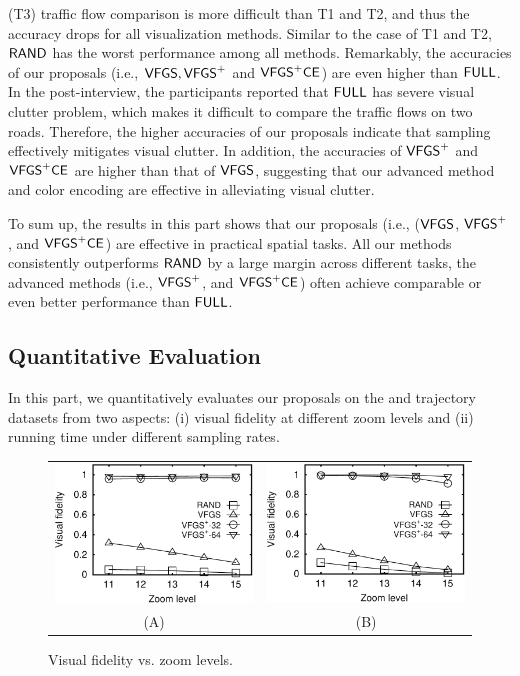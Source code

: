 (T3) traffic flow comparison is more difficult than T1 and T2, and thus the accuracy drops for all visualization methods. Similar to the case of T1 and T2, $\mathsf{RAND}$ has the worst performance among all methods. Remarkably, the accuracies of our proposals (i.e.,  $\mathsf{VFGS},\mathsf{VFGS}^{+}$ and $\mathsf{VFGS}^{+}\mathsf{CE}$) are even higher than $\mathsf{FULL}$. In the post-interview, the participants reported that $\mathsf{FULL}$ has severe visual clutter problem, which makes it difficult to compare the traffic flows on two roads. Therefore, the higher accuracies of our proposals indicate that sampling effectively mitigates visual clutter. In addition, the accuracies of $\mathsf{VFGS}^{+}$ and $\mathsf{VFGS}^{+}\mathsf{CE}$ are higher than that of $\mathsf{VFGS}$, suggesting that our advanced method and color encoding are effective in alleviating visual clutter.

To sum up, the results in this part shows that our proposals (i.e., ($\mathsf{VFGS}$, $\mathsf{VFGS}^{+}$, and $\mathsf{VFGS}^{+}\mathsf{CE}$) are effective in practical spatial tasks. All our methods consistently outperforms $\mathsf{RAND}$ by a large margin across different tasks, the advanced methods (i.e., $\mathsf{VFGS}^{+}$, and $\mathsf{VFGS}^{+}\mathsf{CE}$) often achieve comparable or even better performance than  $\mathsf{FULL}$.

\subsection{Quantitative Evaluation}\label{sec:quality}
In this part, we quantitatively evaluates our proposals on the \pt{} and \sz{} trajectory datasets from two aspects:
(i) visual fidelity at different zoom levels
and (ii) running time under different sampling rates.

\begin{figure}
 \centering
 \small
 \begin{tabular}{cc}
   \includegraphics[width=0.44\columnwidth]{pictures/fporto}
   &
   \includegraphics[width=0.44\columnwidth]{pictures/fshenzhen}
   \\
   (A) \pt{}
   &
   (B) \sz{}
 \end{tabular}
 \vspace{-3mm}
 \caption{Visual fidelity vs. zoom levels.}
 \label{fig:fidelity}
 \vspace{-3mm}
\end{figure}

